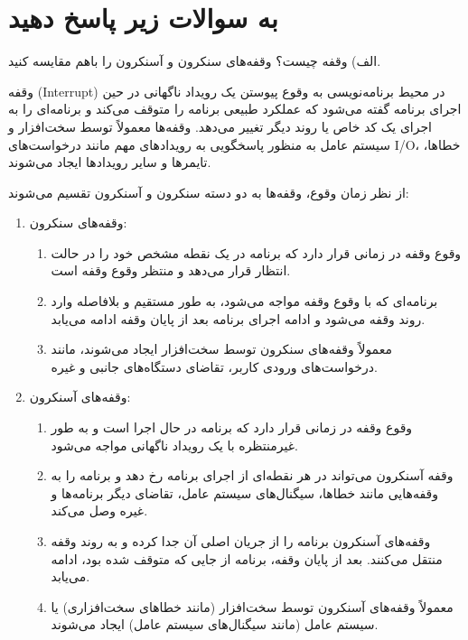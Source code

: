 \section{به سوالات زیر پاسخ دهید}



الف) وقفه چیست؟‌ وقفه‌های سنکرون و آسنکرون را باهم مقایسه کنید.
\begin{qsolve}
وقفه (Interrupt) در محیط برنامه‌نویسی به وقوع پیوستن یک رویداد ناگهانی در حین اجرای برنامه گفته می‌شود که عملکرد طبیعی برنامه را متوقف می‌کند و برنامه‌ای را به اجرای یک کد خاص یا روند دیگر تغییر می‌دهد. وقفه‌ها معمولاً توسط سخت‌افزار و سیستم عامل به منظور پاسخگویی به رویدادهای مهم مانند درخواست‌های I/O، خطاها، تایمرها و سایر رویدادها ایجاد می‌شوند.

از نظر زمان وقوع، وقفه‌ها به دو دسته سنکرون و آسنکرون تقسیم می‌شوند:
\begin{enumerate}
	\item وقفه‌های سنکرون: 
	\begin{enumerate}
		\item وقوع وقفه در زمانی قرار دارد که برنامه در یک نقطه مشخص خود را در حالت انتظار قرار می‌دهد و منتظر وقوع وقفه است.
		\item برنامه‌ای که با وقوع وقفه مواجه می‌شود، به طور مستقیم و بلافاصله وارد روند وقفه می‌شود و ادامه اجرای برنامه بعد از پایان وقفه ادامه می‌یابد.
		\item معمولاً وقفه‌های سنکرون توسط سخت‌افزار ایجاد می‌شوند، مانند درخواست‌های ورودی کاربر، تقاضای دستگاه‌های جانبی و غیره.
	\end{enumerate}
	\item وقفه‌های آسنکرون: 
	\begin{enumerate}
		\item وقوع وقفه در زمانی قرار دارد که برنامه در حال اجرا است و به طور غیرمنتظره با یک رویداد ناگهانی مواجه می‌شود.
		\item وقفه آسنکرون می‌تواند در هر نقطه‌ای از اجرای برنامه رخ دهد و برنامه را به وقفه‌هایی مانند خطاها، سیگنال‌های سیستم عامل، تقاضای دیگر برنامه‌ها و غیره وصل می‌کند.
		\item وقفه‌های آسنکرون برنامه را از جریان اصلی آن جدا کرده و به روند وقفه منتقل می‌کنند. بعد از پایان وقفه، برنامه از جایی که متوقف شده بود، ادامه می‌یابد.
		\item معمولاً وقفه‌های آسنکرون توسط سخت‌افزار (مانند خطاهای سخت‌افزاری) یا سیستم عامل (مانند سیگنال‌های سیستم عامل) ایجاد می‌شوند.
	\end{enumerate}
\end{enumerate}
\end{qsolve}
\newpage




